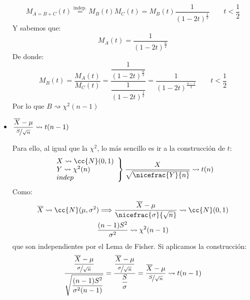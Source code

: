 \begin{coro}
\begin{itemize}
\begin{equation*}
                M_{A=B+C}(t) \stackrel{\text{indep.}}{=} M_B(t) M_C(t) = M_B(t) \dfrac{1}{{(1-2t)}^{\frac{1}{2}}} \qquad t < \frac{1}{2}
            \end{equation*}
            Y sabemos que:
            \begin{equation*}
                M_A(t) = \dfrac{1}{{(1-2t)}^{\frac{n}{2}}}
            \end{equation*}
            De donde:
            \begin{equation*}
                M_B(t) = \dfrac{M_A(t)}{M_C(t)} = \dfrac{\dfrac{1}{{(1-2t)}^{\frac{n}{2}}}}{\dfrac{1}{{(1-2t)}^{\frac{1}{2}}}} = \dfrac{1}{{(1-2t)}^{\frac{n-1}{2}}} \qquad  t<\frac{1}{2}
            \end{equation*}
            Por lo que $B\rightsquigarrow \chi^2(n-1)$
        \item $\dfrac{\overline{X}-\mu}{\nicefrac{S}{\sqrt{n}}}\rightsquigarrow t(n-1)$

            Para ello, al igual que la $\chi^2$, lo más sencillo es ir a la construcción de $t$:
            \begin{equation*}
                \left.\begin{array}{l}
                        X\rightsquigarrow \cc{N}(0,1) \\
                        Y \rightsquigarrow\chi^2(n) \\
                        indep
                \end{array}\right\} \dfrac{X}{\sqrt{\nicefrac{Y}{n}}} \rightsquigarrow t(n)
            \end{equation*}
            Como:
            \begin{gather*}
                \overline{X}\rightsquigarrow\cc{N}(\mu,\sigma^2)\Longrightarrow \dfrac{\overline{X}-\mu}{\nicefrac{\sigma}{\sqrt{n}}} \rightsquigarrow \cc{N}(0,1) \\
                \dfrac{(n-1)S^2}{\sigma^2} \rightsquigarrow \chi^2(n-1)
            \end{gather*}
            que son independientes por el Lema de Fisher. Si aplicamos la construcción:
            \begin{equation*}
                \dfrac{\dfrac{\overline{X}-\mu}{\nicefrac{\sigma}{\sqrt{n}}}}{\sqrt{\dfrac{(n-1)S^2}{\sigma^2(n-1)}}} = \dfrac{\dfrac{\overline{X}-\mu}{\nicefrac{\sigma}{\sqrt{n}}}}{\dfrac{S}{\sigma}} = \dfrac{\overline{X}-\mu}{\nicefrac{S}{\sqrt{n}}} \rightsquigarrow t(n-1)
            \end{equation*}
    \end{itemize}
\end{coro} 

